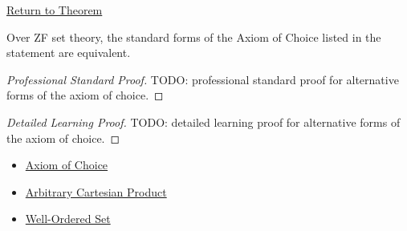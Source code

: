 \newpage
{}
\label{prf:ac-alternative-forms}

\begin{remark*}[Return]
\hyperref[thm:ac-alternative-forms]{Return to Theorem}
\end{remark*}

\begin{theorem*}
Over ZF set theory, the standard forms of the Axiom of Choice listed in the
statement are equivalent.
\end{theorem*}

\begin{proof}[Professional Standard Proof]
\LRAProofBodyStart
TODO: professional standard proof for alternative forms of the axiom of choice.
\end{proof}

\begin{proof}[Detailed Learning Proof]
\LRAProofBodyStart
TODO: detailed learning proof for alternative forms of the axiom of choice.
\end{proof}

\begin{remark*}
\end{remark*}

\begin{dependencies}
\begin{itemize}
  \item \hyperref[ax:choice]{Axiom of Choice}
  \item \hyperref[def:arbitrary-product]{Arbitrary Cartesian Product}
  \item \hyperref[def:well-ordered-set]{Well-Ordered Set}
\end{itemize}
\end{dependencies}

\clearpage
